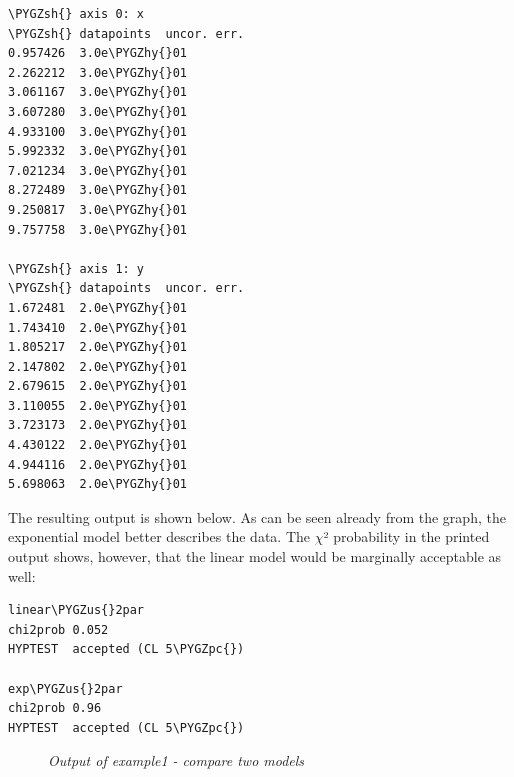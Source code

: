 \documentclass[a4paper,10pt,english]{sphinxmanual}
\def\PYGZus{\char`\_}
\def\PYGZsh{\char`\#}
\def\PYGZpc{\char`\%}
\def\PYGZhy{\char`\-}
\begin{document}
\begin{Verbatim}[commandchars=\\\{\}]
\PYGZsh{} axis 0: x
\PYGZsh{} datapoints  uncor. err.
0.957426  3.0e\PYGZhy{}01
2.262212  3.0e\PYGZhy{}01
3.061167  3.0e\PYGZhy{}01
3.607280  3.0e\PYGZhy{}01
4.933100  3.0e\PYGZhy{}01
5.992332  3.0e\PYGZhy{}01
7.021234  3.0e\PYGZhy{}01
8.272489  3.0e\PYGZhy{}01
9.250817  3.0e\PYGZhy{}01
9.757758  3.0e\PYGZhy{}01

\PYGZsh{} axis 1: y
\PYGZsh{} datapoints  uncor. err.
1.672481  2.0e\PYGZhy{}01
1.743410  2.0e\PYGZhy{}01
1.805217  2.0e\PYGZhy{}01
2.147802  2.0e\PYGZhy{}01
2.679615  2.0e\PYGZhy{}01
3.110055  2.0e\PYGZhy{}01
3.723173  2.0e\PYGZhy{}01
4.430122  2.0e\PYGZhy{}01
4.944116  2.0e\PYGZhy{}01
5.698063  2.0e\PYGZhy{}01
\end{Verbatim}

The resulting output is shown below. As can be seen already
from the graph, the exponential model better describes the
data. The \(\chi\)² probability in the printed output shows, however,
that the linear model would be marginally acceptable as well:

\begin{Verbatim}[commandchars=\\\{\}]
linear\PYGZus{}2par
chi2prob 0.052
HYPTEST  accepted (CL 5\PYGZpc{})

exp\PYGZus{}2par
chi2prob 0.96
HYPTEST  accepted (CL 5\PYGZpc{})
\end{Verbatim}
\begin{figure}[htbp]
\centering
\capstart

\caption{\emph{Output of example1 - compare two models}}\end{figure}
\end{document}
